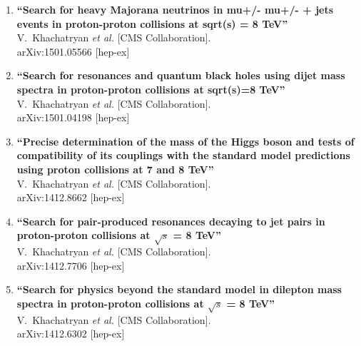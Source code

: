 \documentclass{article}
\begin{document}
\begin{enumerate}



\item%
{\bf ``Search for heavy Majorana neutrinos in mu+/- mu+/- + jets events in proton-proton collisions at sqrt(s) = 8 TeV''}
  \\{}V.~Khachatryan {\it et al.}  [CMS Collaboration].
  \\{}arXiv:1501.05566 [hep-ex]
  



\item%
{\bf ``Search for resonances and quantum black holes using dijet mass spectra in proton-proton collisions at sqrt(s)=8 TeV''}
  \\{}V.~Khachatryan {\it et al.}  [CMS Collaboration].
  \\{}arXiv:1501.04198 [hep-ex]
  



\item%
{\bf ``Precise determination of the mass of the Higgs boson and tests of compatibility of its couplings with the standard model predictions using proton collisions at 7 and 8 TeV''}
  \\{}V.~Khachatryan {\it et al.}  [CMS Collaboration].
  \\{}arXiv:1412.8662 [hep-ex]
  


\item%
{\bf ``Search for pair-produced resonances decaying to jet pairs in proton-proton collisions at $\sqrt{s}$ = 8 TeV''}
  \\{}V.~Khachatryan {\it et al.}  [CMS Collaboration].
  \\{}arXiv:1412.7706 [hep-ex]
  


\item%
{\bf ``Search for physics beyond the standard model in dilepton mass spectra in proton-proton collisions at $\sqrt{s}$ = 8 TeV''}
  \\{}V.~Khachatryan {\it et al.}  [CMS Collaboration].
  \\{}arXiv:1412.6302 [hep-ex]
  

\end{enumerate}
\end{document}
